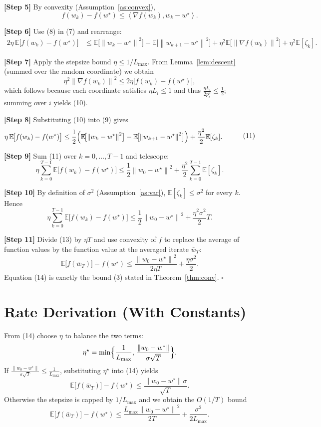 \documentclass{article}
\newcommand{\E}{\mathbb{E}}
\newcommand{\norm}[1]{\left\lVert #1\right\rVert}
\newcommand{\ip}[2]{\left\langle #1,#2\right\rangle}
\begin{document}
\noindent\textbf{[Step 5]}  By convexity (Assumption~\ref{as:convex}),
\[
f(w_k)-f(w^{\star})\le\ip{\nabla f(w_k)}{w_k-w^{\star}}.
\tag{8}
\]

\noindent\textbf{[Step 6]}  Use (8) in (7) and rearrange:
\[
\begin{aligned}
2\eta\,\E\!\bigl[f(w_k)-f(w^{\star})\bigr]
&\le \E\!\bigl[\norm{w_k-w^{\star}}^{2}\bigr]
   -\E\!\bigl[\norm{w_{k+1}-w^{\star}}^{2}\bigr]
   +\eta^{2}\E\!\bigl[\norm{\nabla f(w_k)}^{2}\bigr]
   +\eta^{2}\E[\zeta_k].
\end{aligned}
\tag{9}
\]

\noindent\textbf{[Step 7]}  Apply the stepsize bound $\eta\le 1/L_{\max}$.
From Lemma~\ref{lem:descent} (summed over the random coordinate) we obtain
\[
\eta^{2}\norm{\nabla f(w_k)}^{2}
\le 2\eta\bigl[f(w_k)-f(w^{\star})\bigr],
\tag{10}
\]
which follows because each coordinate satisfies
$\eta L_i\le 1$ and thus
$\frac{\eta L_i}{2p_i^{2}}\le\frac{1}{2}$; summing over $i$ yields (10).

\noindent\textbf{[Step 8]}  Substituting (10) into (9) gives
\[
\begin{aligned}
\eta\,\E\!\bigl[f(w_k)-f(w^{\star})\bigr]
&\le \frac{1}{2}\Bigl(
      \E\!\bigl[\norm{w_k-w^{\star}}^{2}\bigr]
      -\E\!\bigl[\norm{w_{k+1}-w^{\star}}^{2}\bigr]\Bigr)
   +\frac{\eta^{2}}{2}\E[\zeta_k].
\end{aligned}
\tag{11}
\]

\noindent\textbf{[Step 9]}  Sum (11) over $k=0,\dots,T-1$ and telescope:
\[
\eta\sum_{k=0}^{T-1}\E\!\bigl[f(w_k)-f(w^{\star})\bigr]
\le \frac{1}{2}\norm{w_0-w^{\star}}^{2}
   +\frac{\eta^{2}}{2}\sum_{k=0}^{T-1}\E[\zeta_k].
\tag{12}
\]

\noindent\textbf{[Step 10]}  By definition of $\sigma^{2}$ (Assumption~\ref{as:var}),
$\E[\zeta_k]\le\sigma^{2}$ for every $k$. Hence
\[
\eta\sum_{k=0}^{T-1}\E\!\bigl[f(w_k)-f(w^{\star})\bigr]
\le \frac{1}{2}\norm{w_0-w^{\star}}^{2}
   +\frac{\eta^{2}\sigma^{2}}{2}T .
\tag{13}
\]

\noindent\textbf{[Step 11]}  Divide (13) by $\eta T$ and use convexity of $f$
to replace the average of function values by the function value at the
averaged iterate $\bar w_T$:
\[
\E\!\bigl[f(\bar w_T)\bigr]-f(w^{\star})
\le \frac{\norm{w_0-w^{\star}}^{2}}{2\eta T}
   +\frac{\eta\sigma^{2}}{2}.
\tag{14}
\]
Equation (14) is exactly the bound (3) stated in Theorem~\ref{thm:conv}.
\hfill $\square$

\section*{Rate Derivation (With Constants)}
From (14) choose $\eta$ to balance the two terms:
\[
\eta^{\star}= \min\Bigl\{\frac{1}{L_{\max}},\,
                \frac{\norm{w_0-w^{\star}}}{\sigma\sqrt{T}}\Bigr\}.
\]
If $\frac{\norm{w_0-w^{\star}}}{\sigma\sqrt{T}}\le\frac{1}{L_{\max}}$,
substituting $\eta^{\star}$ into (14) yields
\[
\E\!\bigl[f(\bar w_T)\bigr]-f(w^{\star})
\le \frac{\norm{w_0-w^{\star}}\sigma}{\sqrt{T}} .
\]
Otherwise the stepsize is capped by $1/L_{\max}$ and we obtain the
$O(1/T)$ bound
\[
\E\!\bigl[f(\bar w_T)\bigr]-f(w^{\star})
\le \frac{L_{\max}\norm{w_0-w^{\star}}^{2}}{2T}
   +\frac{\sigma^{2}}{2L_{\max}} .
\]
\end{document}
